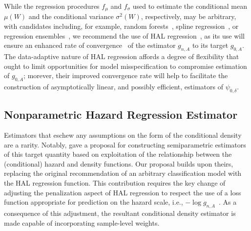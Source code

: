 While the regression procedures $f_{\mu}$ and $f_{\sigma}$ used to estimate the
conditional mean $\mu(W)$ and the conditional variance $\sigma^2(W)$,
respectively, may be arbitrary, with candidates including, for example, random
forests~\citep{breiman2001random}, spline regression~\citep{stone1994use,
friedman1991multivariate}, or regression ensembles~\citep{wolpert1992stacked,
breiman1996stacked,vdl2007super}, we recommend the use of HAL
regression~\citep{benkeser2016highly,vdl2017generally}, as its use will ensure
an enhanced rate of convergence~\citep{bibaut2019fast} of the estimator
$g_{n,A}$ to its target $g_{0,A}$. The data-adaptive nature of HAL regression
affords a degree of flexibility that ought to limit opportunities for model
misspecification to compromise estimation of $g_{0,A}$; morever, their improved
convergence rate will help to facilitate the construction of asymptotically
linear, and possibly efficient, estimators of $\psi_{0, \delta}$.

\subsection{Nonparametric Hazard Regression Estimator}\label{pooled_haz_est}

Estimators that eschew any assumptions on the form of the conditional density
are a rarity. Notably, \citet{diaz2011super} gave a proposal for constructing
semiparametric estimators of this target quantity based on exploitation of the
relationship between the (conditional) hazard and density functions. Our
proposal builds upon theirs, replacing the original recommendation of an
arbitrary classification model with the HAL regression function. This
contribution requires the key change of adjusting the penalization aspect of HAL
regression to respect the use of a loss function appropriate for prediction on
the hazard scale, i.e., $-\log g_{n,A}$~\citep{dudoit2005asymptotics}. As
a consequence of this adjustment, the resultant conditional density estimator
is made capable of incorporating sample-level weights.

